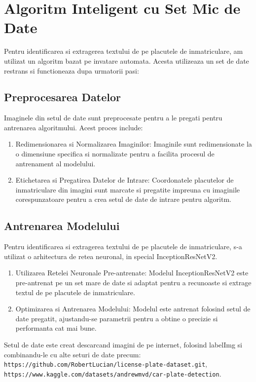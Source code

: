 \documentclass[12pt]{article}
\begin{document}
\section*{Algoritm Inteligent cu Set Mic de Date}
Pentru identificarea si extragerea textului de pe placutele de inmatriculare, am utilizat un algoritm bazat pe invatare automata. Acesta utilizeaza un set de date restrans si functioneaza dupa urmatorii pasi:

\subsection*{Preprocesarea Datelor}
Imaginele din setul de date sunt preprocesate pentru a le pregati pentru antrenarea algoritmului. Acest proces include:

\begin{enumerate}
  \item Redimensionarea si Normalizarea Imaginilor: Imaginile sunt redimensionate la o dimensiune specifica si normalizate pentru a facilita procesul de antrenament al modelului.
  \item Etichetarea si Pregatirea Datelor de Intrare: Coordonatele placutelor de inmatriculare din imagini sunt marcate si pregatite impreuna cu imaginile corespunzatoare pentru a crea setul de date de intrare pentru algoritm.
\end{enumerate}

\subsection*{Antrenarea Modelului}
Pentru identificarea si extragerea textului de pe placutele de inmatriculare, s-a utilizat o arhitectura de retea neuronal, in special InceptionResNetV2.

\begin{enumerate}
  \item Utilizarea Retelei Neuronale Pre-antrenate: Modelul InceptionResNetV2 este pre-antrenat pe un set mare de date si adaptat pentru a recunoaste si extrage textul de pe placutele de inmatriculare.
  \item Optimizarea si Antrenarea Modelului: Modelul este antrenat folosind setul de date pregatit, ajustandu-se parametrii pentru a obtine o precizie si performanta cat mai bune.
\end{enumerate}

Setul de date este creat descarcand imagini de pe internet, folosind labelImg si combinandu-le cu alte seturi de date precum: \texttt{https://github.com/RobertLucian/license-plate-dataset.git}, \texttt{https://www.kaggle.com/datasets/andrewmvd/car-plate-detection}.
\end{document}
